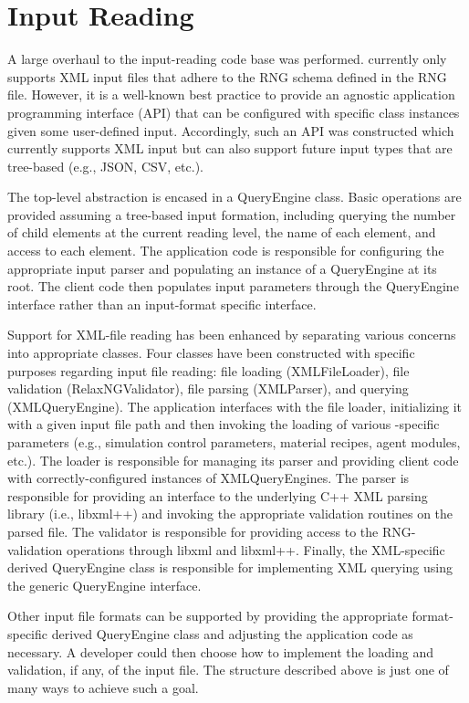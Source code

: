\section{Input Reading}

A large overhaul to the input-reading code base was performed. \Cyclus currently
only supports XML input files that adhere to the RNG schema defined in the
\Cyclus RNG file. However, it is a well-known best practice to provide an
agnostic application programming interface (API) that can be configured with
specific class instances given some user-defined input. Accordingly, such an API
was constructed which currently supports XML input but can also support future
input types that are tree-based (e.g., JSON, CSV, etc.).

The top-level abstraction is encased in a QueryEngine class. Basic operations
are provided assuming a tree-based input formation, including querying the
number of child elements at the current reading level, the name of each element,
and access to each element. The application code is responsible for configuring
the appropriate input parser and populating an instance of a QueryEngine at its
root. The client code then populates input parameters through the QueryEngine
interface rather than an input-format specific interface.

Support for XML-file reading has been enhanced by separating various concerns
into appropriate classes. Four classes have been constructed with specific
purposes regarding input file reading: file loading (XMLFileLoader), file
validation (RelaxNGValidator), file parsing (XMLParser), and querying
(XMLQueryEngine). The application interfaces with the file loader, initializing
it with a given input file path and then invoking the loading of various
\Cyclus-specific parameters (e.g., simulation control parameters, material
recipes, agent modules, etc.). The loader is responsible for managing its parser
and providing client code with correctly-configured instances of
XMLQueryEngines. The parser is responsible for providing an interface to the
underlying C++ XML parsing library (i.e., libxml++) and invoking the appropriate
validation routines on the parsed file. The validator is responsible for
providing access to the RNG-validation operations through libxml and
libxml++. Finally, the XML-specific derived QueryEngine class is responsible for
implementing XML querying using the generic QueryEngine interface.

Other input file formats can be supported by providing the appropriate
format-specific derived QueryEngine class and adjusting the application code as
necessary. A developer could then choose how to implement the loading and
validation, if any, of the input file. The structure described above is just one
of many ways to achieve such a goal.
